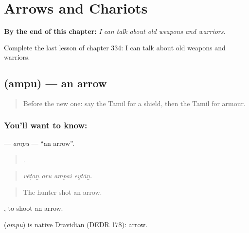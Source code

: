 
\chapter{Arrows and Chariots}
\label{ch:ta-arrows-and-chariots}

\begin{chapteropening}
\textbf{By the end of this chapter:} \emph{I can talk about old weapons and warriors.}

Complete the last lesson of chapter 334: I can talk about old weapons and warriors.
\end{chapteropening}

\section[\texorpdfstring{\ta{அம்பு} (ampu)}{அம்பு (ampu)}]{ (ampu) — an arrow}

\label{lesson:TA-C334-ampu}



\begin{quote}
Before the new one: say the Tamil for a shield, then the Tamil for armour.
\end{quote}

\subsection*{You'll want to know: }
\textbf{} — \emph{ampu} — \textquotedblleft{}an arrow\textquotedblright{}.

\begin{quote}
   .
\end{quote}

\begin{quote}
\emph{vēṭaṉ oru ampai eytāṉ.}
\end{quote}

\begin{quote}
The hunter shot an arrow.
\end{quote}

 , to shoot an arrow.

\begin{cousinweb}
\textbf{} (\emph{ampu}) is native Dravidian (DEDR 178): arrow.
\end{cousinweb}

